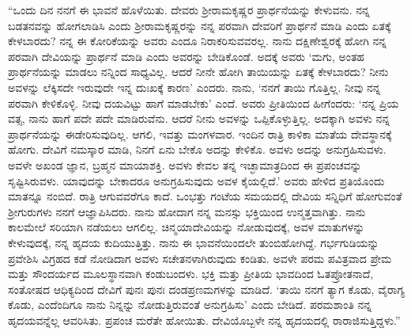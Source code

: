 “ಒಂದು ದಿನ ನನಗೆ ಈ ಭಾವನೆ ಹೊಳೆಯಿತು. ದೇವರು ಶ‍್ರೀರಾಮಕೃಷ್ಣರ ಪ್ರಾರ್ಥನೆಯನ್ನು ಕೇಳುವನು. ನನ್ನ ಬಡತನವನ್ನು ಹೋಗಲಾಡಿಸಿ ಎಂದು ಶ‍್ರೀರಾಮಕೃಷ್ಣರನ್ನು ನನ್ನ ಪರವಾಗಿ ದೇವರಿಗೆ ಪ್ರಾರ್ಥನೆ ಮಾಡಿ ಎಂದು ಏತಕ್ಕೆ ಕೇಳಬಾರದು? ನನ್ನ ಈ ಕೋರಿಕೆಯನ್ನು ಅವರು ಎಂದೂ ನಿರಾಕರಿಸುವವರಲ್ಲ. ನಾನು ದಕ್ಷಿಣೇಶ್ವರಕ್ಕೆ ಹೋಗಿ ನನ್ನ ಪರವಾಗಿ ದೇವಿಯನ್ನು ಪ್ರಾರ್ಥನೆ ಮಾಡಿ ಎಂದು ಅವರನ್ನು ಬೇಡಿಕೊಂಡೆ. ಅದಕ್ಕೆ ಅವರು ‘ಮಗು, ಅಂತಹ ಪ್ರಾರ್ಥನೆಯನ್ನು ಮಾಡಲು ನನ್ನಿಂದ ಸಾಧ್ಯವಿಲ್ಲ. ಆದರೆ ನೀನೇ ಹೋಗಿ ತಾಯಿಯನ್ನು ಏತಕ್ಕೆ ಕೇಳಬಾರದು? ನೀನು ಅವಳನ್ನು ಲೆಕ್ಕಿಸದೇ ಇರುವುದೇ ಇನ್ನ ದುಃಖಕ್ಕೆ ಕಾರಣ’ ಎಂದರು. ನಾನು, ‘ನನಗೆ ತಾಯಿ ಗೊತ್ತಿಲ್ಲ. ನೀವು ನನ್ನ ಪರವಾಗಿ ಕೇಳಿಕೊಳ್ಳಿ. ನೀವು ದಯವಿಟ್ಟು ಹಾಗೆ ಮಾಡಬೇಕು’ ಎಂದೆ. ಅವರು ಪ್ರೀತಿಯಿಂದ ಹೀಗೆಂದರು: ‘ನನ್ನ ಪ್ರಿಯ ವತ್ಸ, ನಾನು ಹಾಗೆ ಪದೇ ಪದೇ ಮಾಡಿರುವೆನು. ಆದರೆ ನೀನು ಅವಳನ್ನು ಒಪ್ಪಿಕೊಳ್ಳುತ್ತಿಲ್ಲ. ಅದಕ್ಕಾಗಿ ಅವಳು ನನ್ನ ಪ್ರಾರ್ಥನೆಯನ್ನು ಈಡೇರಿಸುವುದಿಲ್ಲ. ಆಗಲಿ, ಇವತ್ತು ಮಂಗಳವಾರ. ಇಂದಿನ ರಾತ್ರಿ ಕಾಳಿಕಾ ಮಾತೆಯ ದೇವಸ್ಥಾನಕ್ಕೆ ಹೋಗು. ದೇವಿಗೆ ನಮಸ್ಕಾರ ಮಾಡಿ, ನಿನಗೆ ಏನು ಬೇಕೊ ಅದನ್ನು ಕೇಳಿಕೊ. ಅವಳು ಅದನ್ನು ಅನುಗ್ರಹಿಸುವಳು. ಅವಳೇ ಅಖಂಡ ಜ್ಞಾನ, ಬ್ರಹ್ಮನ ಮಾಯಾಶಕ್ತಿ. ಅವಳು ಕೇವಲ ತನ್ನ ಇಚ್ಛಾಮಾತ್ರದಿಂದ ಈ ಪ್ರಪಂಚವನ್ನು ಸೃಷ್ಟಿಸಿರುವಳು. ಯಾವುದನ್ನು ಬೇಕಾದರೂ ಅನುಗ್ರಹಿಸುವುದು ಅವಳ ಕೈಯಲ್ಲಿದೆ.’ ಅವರು ಹೇಳಿದ ಪ್ರತಿಯೊಂದು ಮಾತನ್ನೂ ನಂಬಿದೆ. ರಾತ್ರಿ ಆಗುವವರೆಗೂ ಕಾದೆ. ಒಂಭತ್ತು ಗಂಟೆಯ ಸಮಯದಲ್ಲಿ ದೇವಿಯ ಸನ್ನಿಧಿಗೆ ಹೋಗುವಂತೆ ಶ‍್ರೀಗುರುಗಳು ನನಗೆ ಆಜ್ಞಾಪಿಸಿದರು. ನಾನು ಹೋದಾಗ ನನ್ನ ಮನಸ್ಸು ಭಕ್ತಿಯಿಂದ ಉನ್ಮತ್ತವಾಗಿತ್ತು. ನಾನು ಕಾಲಮೇಲೆ ಸರಿಯಾಗಿ ನಡೆಯಲು ಆಗಲಿಲ್ಲ. ಚಿನ್ಮಯಾದೇವಿಯನ್ನು ನೋಡುವುದಕ್ಕೆ, ಅವಳ ಮಾತುಗಳನ್ನು ಕೇಳುವುದಕ್ಕೆ, ನನ್ನ ಹೃದಯ ಕುದಿಯುತ್ತಿತ್ತು. ನಾನು ಈ ಭಾವನೆಯಿಂದಲೇ ತುಂಬಿಹೋಗಿದ್ದೆ. ಗರ್ಭಗುಡಿಯನ್ನು ಪ್ರವೇಶಿಸಿ ವಿಗ್ರಹದ ಕಡೆ ನೋಡಿದಾಗ ಅವಳು ಸಚೇತನಳಾಗಿರುವುದು ಕಂಡಿತು. ಅವಳೇ ಪರಮ ಪವಿತ್ರವಾದ ಪ್ರೇಮ ಮತ್ತು ಸೌಂದರ್ಯದ ಮೂಲಸ್ಥಾನವಾಗಿ ಕಂಡುಬಂದಳು. ಭಕ್ತಿ ಮತ್ತು ಪ್ರೀತಿಯ ಭಾವದಿಂದ ಓತಪ್ರೋತನಾದೆ, ಸಂತೋಷದ ಆಧಿಕ್ಯದಿಂದ ದೇವಿಗೆ ಪುನಃ ಪುನಃ ದಂಡಪ್ರಣಮಗಳನ್ನು ಮಾಡಿದೆ. ‘ತಾಯಿ ನನಗೆ ತ್ಯಾಗ ಕೊಡು, ವೈರಾಗ್ಯ ಕೊಡು, ಎಂದೆಂದಿಗೂ ನಾನು ನಿನ್ನನ್ನು ನೋಡುತ್ತಿರುವಂತೆ ಅನುಗ್ರಹಿಸು’ ಎಂದು ಬೇಡಿದೆ. ಪರಮಶಾಂತಿ ನನ್ನ ಹೃದಯವನ್ನೆಲ್ಲ ಆವರಿಸಿತು. ಪ್ರಪಂಚ ಮರೆತೇ ಹೋಯಿತು. ದೇವಿಯೊಬ್ಬಳೇ ನನ್ನ ಹೃದಯದಲ್ಲಿ ರಾರಾಜಿಸುತ್ತಿದ್ದಳು.”

